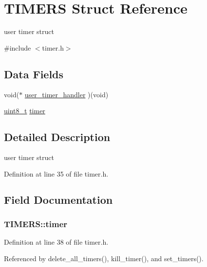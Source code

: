 \hypertarget{structTIMERS}{}\section{T\+I\+M\+E\+RS Struct Reference}
\label{structTIMERS}


user timer struct  




{\ttfamily \#include $<$timer.\+h$>$}

\subsection*{Data Fields}
\begin{DoxyCompactItemize}
\item 
void($\ast$ \hyperlink{structTIMERS_a4326e05ca52d80147efafd0d246ecb41}{user\+\_\+timer\+\_\+handler} )(void)
\item 
\hyperlink{send_8c_aba7bc1797add20fe3efdf37ced1182c5}{uint8\+\_\+t} \hyperlink{structTIMERS_a0b10fdb7b0e6b1d3ca49718f47c4514d}{timer}
\end{DoxyCompactItemize}


\subsection{Detailed Description}
user timer struct 

Definition at line 35 of file timer.\+h.



\subsection{Field Documentation}
\subsubsection[{\texorpdfstring{timer}{timer}}]{ T\+I\+M\+E\+R\+S\+::timer}\hypertarget{structTIMERS_a0b10fdb7b0e6b1d3ca49718f47c4514d}{}\label{structTIMERS_a0b10fdb7b0e6b1d3ca49718f47c4514d}


Definition at line 38 of file timer.\+h.



Referenced by delete\+\_\+all\+\_\+timers(), kill\+\_\+timer(), and set\+\_\+timers().

